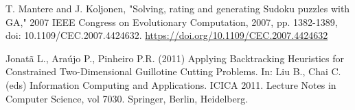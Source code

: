 \documentclass{svproc}
\begin{document}
\begin{thebibliography}{6}
T. Mantere and J. Koljonen, "Solving, rating and generating Sudoku puzzles with GA," 2007 IEEE Congress on Evolutionary Computation, 2007, pp. 1382-1389, doi: 10.1109/CEC.2007.4424632.
\url{https://doi.org/10.1109/CEC.2007.4424632}

Jonatã L., Araújo P., Pinheiro P.R. (2011) Applying Backtracking Heuristics for Constrained Two-Dimensional Guillotine Cutting Problems. In: Liu B., Chai C. (eds) Information Computing and Applications. ICICA 2011. Lecture Notes in Computer Science, vol 7030. Springer, Berlin, Heidelberg.

\end{thebibliography}
\end{document}
